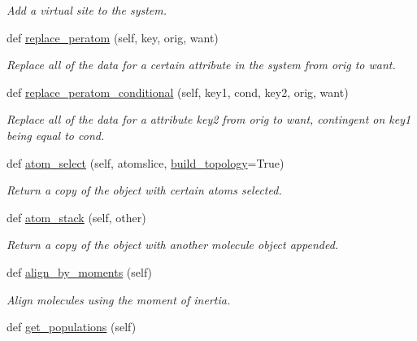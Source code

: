 \begin{DoxyCompactItemize}
\begin{DoxyCompactList}\small\item\em Add a virtual site to the system. \end{DoxyCompactList}\item 
def \hyperlink{classsrc_1_1molecule_1_1Molecule_a10b21e9ed15d4d1d3242a2696a939e61}{replace\+\_\+peratom} (self, key, orig, want)
\begin{DoxyCompactList}\small\item\em Replace all of the data for a certain attribute in the system from orig to want. \end{DoxyCompactList}\item 
def \hyperlink{classsrc_1_1molecule_1_1Molecule_a958636d732433ffc356a1f7a1e70d7d7}{replace\+\_\+peratom\+\_\+conditional} (self, key1, cond, key2, orig, want)
\begin{DoxyCompactList}\small\item\em Replace all of the data for a attribute key2 from orig to want, contingent on key1 being equal to cond. \end{DoxyCompactList}\item 
def \hyperlink{classsrc_1_1molecule_1_1Molecule_af7b405613971e5d76720b1a655e05981}{atom\+\_\+select} (self, atomslice, \hyperlink{classsrc_1_1molecule_1_1Molecule_afae2c34b572e137801c8077f4267b247}{build\+\_\+topology}=True)
\begin{DoxyCompactList}\small\item\em Return a copy of the object with certain atoms selected. \end{DoxyCompactList}\item 
def \hyperlink{classsrc_1_1molecule_1_1Molecule_a06d6ebbb45f759c58b30f6c7c084c3e5}{atom\+\_\+stack} (self, other)
\begin{DoxyCompactList}\small\item\em Return a copy of the object with another molecule object appended. \end{DoxyCompactList}\item 
def \hyperlink{classsrc_1_1molecule_1_1Molecule_a73446a192061fe52b26899005e3bbc31}{align\+\_\+by\+\_\+moments} (self)
\begin{DoxyCompactList}\small\item\em Align molecules using the moment of inertia. \end{DoxyCompactList}\item 
def \hyperlink{classsrc_1_1molecule_1_1Molecule_a692df3c446a2c9517ab4a3d2a9e7b373}{get\+\_\+populations} (self)

\end{DoxyCompactItemize}
